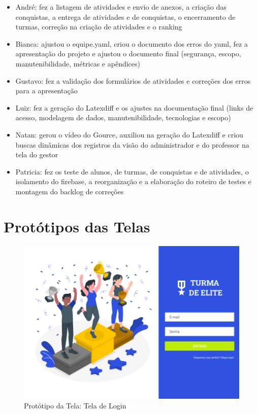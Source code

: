 \begin{apendicesenv}
\begin{itemize}
\item André: fez a listagem de atividades e envio de anexos, a criação das conquistas, a entrega de atividades e de conquistas, o encerramento de turmas, correção na criação de atividades e o ranking
\item Bianca: ajustou o equipe.yaml, criou o documento dos erros do yaml, fez a apresentação do projeto e ajustou o documento final (segurança, escopo, manutenibilidade, métricas e apêndices)
\item Gustavo: fez a validação dos formulários de atividades e correções dos erros para a apresentação
\item Luiz: fez a geração do Latexdiff e os ajustes na documentação final (links de acesso, modelagem de dados, manutenibilidade, tecnologias e escopo)
\item Natan: gerou o vídeo do Gource, auxiliou na geração do Latexdiff e criou buscas dinâmicas dos registros da visão do administrador e do professor na tela do gestor
\item Patricia: fez os teste de alunos, de turmas, de conquistas e de atividades, o isolamento do firebase, a reorganização e a elaboração do roteiro de testes e montagem do backlog de correções
\end{itemize}

\chapter{Protótipos das Telas}
\label{prototipos}

\begin{figure}[htb]
    \centering
	\includegraphics[width=16cm]{imagens/Geral-Login.png}
	\caption{\label{fig:login} Protótipo da Tela: Tela de Login}
\end{figure}
\FloatBarrier



\end{apendicesenv}
